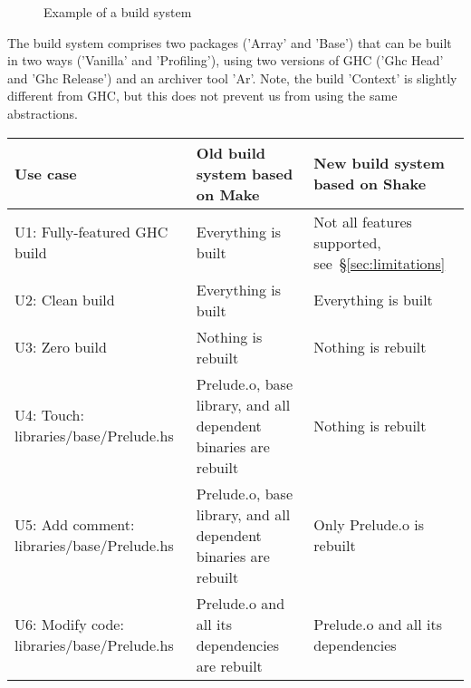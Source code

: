\begin{figure}
\caption{Example of a build system\label{fig:example-abstractions}}
\end{figure}

The build system comprises two packages (\lst'Array' and \lst'Base') that can
be built in two ways (\lst'Vanilla' and \lst'Profiling'), using two versions
of GHC (\lst'Ghc Head' and \lst'Ghc Release') and an archiver tool \lst'Ar'.
Note, the build \lst'Context' is slightly different from GHC, but this does not
prevent us from using the same abstractions.

\newcommand{\checkedbox}{\makebox[0pt][l]{$\square$}\raisebox{.15ex}{\hspace{0.1em}$\checkmark$}}
\newcommand{\uncheckedbox}{\makebox[0pt][l]{$\square$}\raisebox{.15ex}{\hspace{0.92em}}}
\begin{table*}[t]
\centering
\begin{tabular}{p{60mm} || p{50mm} | p{50mm}}
\textbf{Use case}
& \textbf{Old build system} based on Make
& \textbf{New build system} based on Shake
\\
\hline
\textsf{U1:} Fully-featured GHC build
& Everything is built \hfill \checkedbox
& Not all features supported, see~\S\ref{sec:limitations} \hfill \uncheckedbox
\\
\textsf{U2:} Clean build
& Everything is built \hfill \checkedbox
& Everything is built \hfill \checkedbox
\\
\textsf{U3:} Zero build \hspace{6.4mm}
& Nothing is rebuilt \hfill \checkedbox
& Nothing is rebuilt \hfill \checkedbox
\\
\hline
\textsf{U4:} Touch: \hspace{10.2mm}\textsf{libraries/base/Prelude.hs}
& \textsf{Prelude.o}, \textsf{base} library, and all \hfill \uncheckedbox
\newline dependent binaries are rebuilt
& Nothing is rebuilt \hfill \checkedbox
\\
\textsf{U5:} Add comment: \textsf{libraries/base/Prelude.hs}
& \textsf{Prelude.o}, \textsf{base} library, and all \hfill \uncheckedbox
\newline dependent binaries are rebuilt
& Only \textsf{Prelude.o} is rebuilt \hfill \checkedbox
\\
\textsf{U6:} Modify code: \hspace{1.75mm}\textsf{libraries/base/Prelude.hs}
& \textsf{Prelude.o} and all its dependencies \hfill \checkedbox \newline
are rebuilt
& \textsf{Prelude.o} and all its dependencies \hfill \checkedbox \newline

\end{tabular}
\end{table*}
